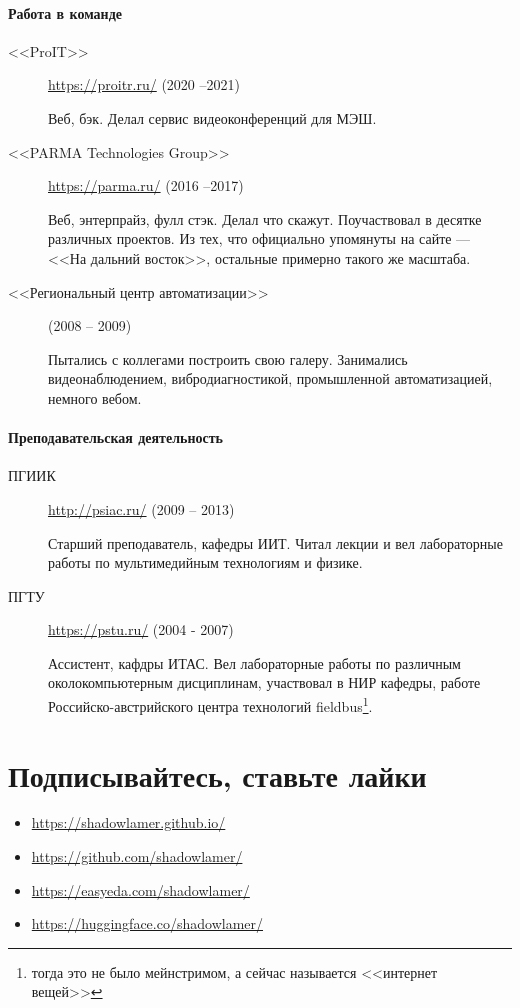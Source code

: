 \documentclass [a4paper,10pt]{article}
\begin{document}
\paragraph{Работа в команде}
\begin{description}
\item[<<ProIT>>] \url{https://proitr.ru/} (2020 --2021)

Веб, бэк. Делал сервис видеоконференций для МЭШ.

\item[<<PARMA Technologies Group>>] \url{https://parma.ru/} (2016 --2017)
	
Веб, энтерпрайз, фулл стэк. Делал что скажут. Поучаствовал в десятке различных проектов.
Из тех, что официально упомянуты на сайте --- <<На дальний восток>>, остальные примерно такого же масштаба.

\item[<<Региональный центр автоматизации>>] (2008 -- 2009)

Пытались с коллегами построить свою галеру. Занимались видеонаблюдением, вибродиагностикой, промышленной автоматизацией, немного вебом.
\end{description}

\paragraph{Преподавательская деятельность}
\begin{description}
\item[ПГИИК] \url{http://psiac.ru/} (2009 -- 2013)

Старший преподаватель, кафедры ИИТ. Читал лекции и вел лабораторные работы по мультимедийным технологиям и физике.

\item[ПГТУ] \url{https://pstu.ru/} (2004 - 2007)

Ассистент, кафдры ИТАС. Вел лабораторные работы по различным околокомпьютерным дисциплинам,
участвовал в НИР кафедры, работе Российско-австрийского центра технологий fieldbus\footnote{тогда это не было мейнстримом, а сейчас называется <<интернет вещей>>}.
\end{description}

\section*{Подписывайтесь, ставьте лайки}
\begin{itemize}
\item\url{https://shadowlamer.github.io/}
\item\url{https://github.com/shadowlamer/}
\item\url{https://easyeda.com/shadowlamer/}
\item\url{https://huggingface.co/shadowlamer/}
\end{itemize}
\end{document}
